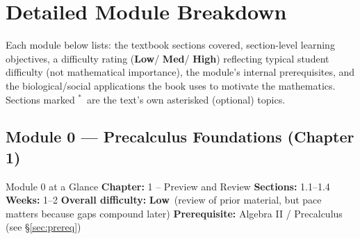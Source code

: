 \documentclass[11pt]{article}
\newcommand{\diffL}{\textcolor{diffgreenc}{\textbf{Low}}}
\newcommand{\diffM}{\textcolor{diffamberc}{\textbf{Med}}}
\newcommand{\diffH}{\textcolor{diffredc}{\textbf{High}}}
\newcommand{\opt}{$^{\ast}$}
\begin{document}
\newpage
\section{Detailed Module Breakdown}

Each module below lists: the textbook sections covered, section-level learning objectives,
a difficulty rating (\diffL / \diffM / \diffH) reflecting typical student difficulty (not
mathematical importance), the module's internal prerequisites, and the biological/social
applications the book uses to motivate the mathematics. Sections marked \opt\ are the
text's own asterisked (optional) topics.

\subsection*{Module 0 --- Precalculus Foundations (Chapter 1)}

\begin{modulebox}{Module 0 at a Glance}{}
\textbf{Chapter:} 1 -- Preview and Review \quad\textbf{Sections:} 1.1--1.4 \quad
\textbf{Weeks:} 1--2 \quad \textbf{Overall difficulty:} \diffL\ (review of prior material,
but pace matters because gaps compound later) \quad
\textbf{Prerequisite:} Algebra II / Precalculus (see \S\ref{sec:prereq})
\end{modulebox}
\end{document}
